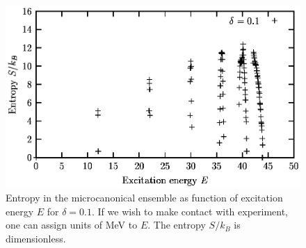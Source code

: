 \begin{figure}
\includegraphics[totalheight=20cm,angle=0,bb=0 20 350 730]{fig4.ps}
\caption{Entropy in the microcanonical ensemble as function of excitation energy $E$ for $\delta=0.1$.
If we wish to make contact with experiment, one can assign units of MeV to $E$.
The entropy $S/k_B$ is dimensionless.} 
\label{fig:fig4}
\end{figure}

